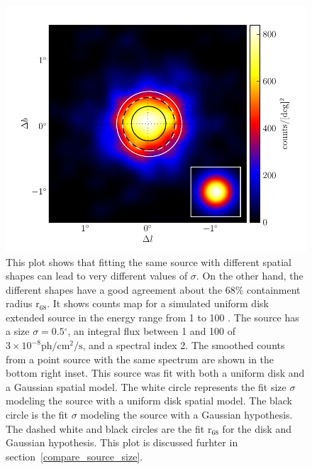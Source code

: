 \documentclass[12pt,preprint]{aastex}
\newcommand{\gev}{\text{GeV}\xspace}
\newcommand{\ph}{\text{ph}\xspace}
\newcommand{\cm}{\text{cm}\xspace}
\renewcommand{\sec}{\text{s}\xspace}
\newcommand{\rsixeight}{{\ensuremath{\text{r}_{68}}}\xspace}
\renewcommand{\deg}{\ensuremath{^\circ}\xspace}
\begin{document}
  \begin{figure}
    \begin{center}
      \includegraphics{mc_plots/compare_r68.pdf}
      \end{center}
      \caption{
      This plot shows that fitting the same source with different spatial
      shapes can lead to very different values of $\sigma$. On the other
      hand, the different shapes have a good agreement about the 68\%
      containment radius \rsixeight.  It shows counts map for a simulated
      uniform disk extended source in the energy range from 1 \gev to
      100 \gev.  The source has a size $\sigma=0.5\deg$, an integral flux
      between 1 \gev and 100 \gev of $3\times 10^{-8}\ph/\cm^2/\sec$, and
      a spectral index 2.  The smoothed counts from a point source with
      the same spectrum are shown in the bottom right inset.  This source
      was fit with both a uniform disk and a Gaussian spatial model.
      The white circle represents the fit size $\sigma$ modeling the
      source with a uniform disk spatial model.  The black circle is
      the fit $\sigma$ modeling the source with a Gaussian hypothesis.
      The dashed white and black circles are the fit \rsixeight for the
      disk and Gaussian hypothesis. This plot is discussed furhter in
      section~\ref{compare_source_size}.
      }\label{compare_r68}
    \end{figure}
\end{document}
